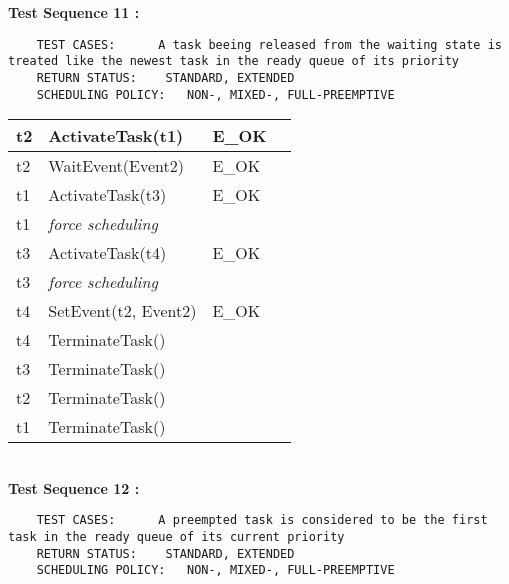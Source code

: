 \documentclass[10pt]{article}
\newlength{\Li}\settowidth{\Li}{Running}
\newlength{\Lii}\setlength{\Lii}{7cm}
\newlength{\Liiii}\setlength{\Liiii}{0.9cm}
\newlength{\Liii}\setlength{\Liii}{\textwidth} \addtolength{\Liii}{-\Li} \addtolength{\Liii}{-\Lii} \addtolength{\Liii}{-\Liiii}
\begin{document}
	\textbf{Test Sequence 11 :}
	\begin{lstlisting}
	TEST CASES:		 A task beeing released from the waiting state is treated like the newest task in the ready queue of its priority
	RETURN STATUS:	  STANDARD, EXTENDED
	SCHEDULING POLICY:   NON-, MIXED-, FULL-PREEMPTIVE
	\end{lstlisting}
	

	\begin{supertabular}{|p{\Li}|p{\Lii}|p{\Liii}|p{\Liiii}|} \hline
	t2	& ActivateTask(t1) 			& E\_OK				& \\ \hline 
	t2	& WaitEvent(Event2) 			& E\_OK				&  \\ \hline
	t1	& ActivateTask(t3)			& E\_OK				&  \\ \hline
	t1 	& \textit{force scheduling}			& 					& \\ \hline
	t3 	& ActivateTask(t4) 			& E\_OK				&  \\ \hline
	t3 	& \textit{force scheduling}			& 					& \\ \hline
	t4	& SetEvent(t2, Event2)		& E\_OK				&  \\ \hline
	t4	& TerminateTask()				&					&  \\ \hline 
	t3	& TerminateTask()				&					&  \\ \hline 
	t2	& TerminateTask()				&					&  \\ \hline 
	t1	& TerminateTask()				&					&  \\ \hline
	\end{supertabular} \\

	\textbf{Test Sequence 12 :}
	\begin{lstlisting}
	TEST CASES:		 A preempted task is considered to be the first task in the ready queue of its current priority
	RETURN STATUS:	  STANDARD, EXTENDED
	SCHEDULING POLICY:   NON-, MIXED-, FULL-PREEMPTIVE
	\end{lstlisting}
	
\end{document}
